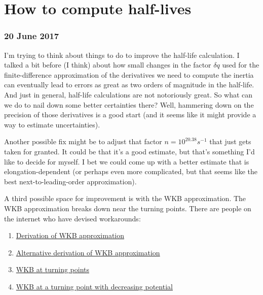 \chapter{How to compute half-lives}
\maketitle

\subsection*{20 June 2017}
I'm trying to think about things to do to improve the half-life calculation. I talked a bit before (I think) about how small changes in the factor $\delta q$ used for the finite-difference approximation of the derivatives we need to compute the inertia can eventually lead to errors as great as two orders of magnitude in the half-life. And just in general, half-life calculations are not notoriously great. So what can we do to nail down some better certainties there? Well, hammering down on the precision of those derivatives is a good start (and it seems like it might provide a way to estimate uncertainties).

Another possible fix might be to adjust that factor $n=10^{20.38} s^{-1}$ that just gets taken for granted. It could be that it's a good estimate, but that's something I'd like to decide for myself. I bet we could come up with a better estimate that is elongation-dependent (or perhaps even more complicated, but that seems like the best next-to-leading-order approximation).

A third possible space for improvement is with the WKB approximation. The WKB approximation breaks down near the turning points. There are people on the internet who have devised workarounds:

\begin{enumerate}
\item \href{http://www.physicspages.com/2014/07/03/wkb-approximation-tunneling/}{Derivation of WKB approximation}
\item \href{http://www.physicspages.com/2014/06/30/wkb-approximation-alternative-derivation/}{Alternative derivation of WKB approximation}
\item \href{http://www.physicspages.com/2014/07/09/wkb-approximation-turning-points/}{WKB at turning points}
\item \href{http://www.physicspages.com/2014/07/14/wkb-approximation-at-a-turning-point-with-decreasing-potential/}{WKB at a turning point with decreasing potential}
\end{enumerate}

